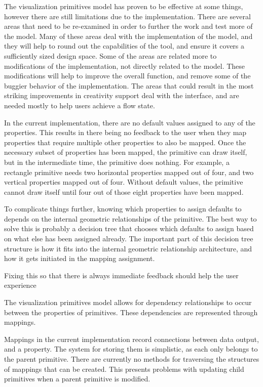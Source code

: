 \label{futureWork}
The visualization primitives model has proven to be effective at some things, however there are still limitations due to the implementation.
There are several areas that need to be re-examined in order to further the work and test more of the model.
Many of these areas deal with the implementation of the model, and they will help to round out the capabilities of the tool, and ensure it covers a sufficiently sized design space.
Some of the areas are related more to modifications of the implementation, not directly related to the model.
These modifications will help to improve the overall function, and remove some of the buggier behavior of the implementation.
The areas that could result in the most striking improvements in creativity support deal with the interface, and are needed mostly to help users achieve a flow state.

\label{defaultValues}
In the current implementation, there are no default values assigned to any of the properties.
This results in there being no feedback to the user when they map properties that require multiple other properties to also be mapped.
Once the necessary subset of properties has been mapped, the primitive can draw itself, but in the intermediate time, the primitive does nothing.
For example, a rectangle primitive needs two horizontal properties mapped out of four, and two vertical properties mapped out of four.
Without default values, the primitive cannot draw itself until four out of those eight properties have been mapped.

To complicate things further, knowing which properties to assign defaults to depends on the internal geometric relationships of the primitive.
The best way to solve this is probably a decision tree that chooses which defaults to assign based on what else has been assigned already.
The important part of this decision tree structure is how it fits into the internal geometric relationship architecture, and how it gets initiated in the mapping assignment.

Fixing this so that there is always immediate feedback should help the user experience 

\label{primitivesGraph}
The visualization primitives model allows for dependency relationships to occur between the properties of primitives.
These dependencies are represented through mappings.

Mappings in the current implementation record connections between data output, and a property.
The system for storing them is simplistic, as each only belongs to the parent primitive.
There are currently no methods for traversing the structures of mappings that can be created.
This presents problems with updating child primitives when a parent primitive is modified.

